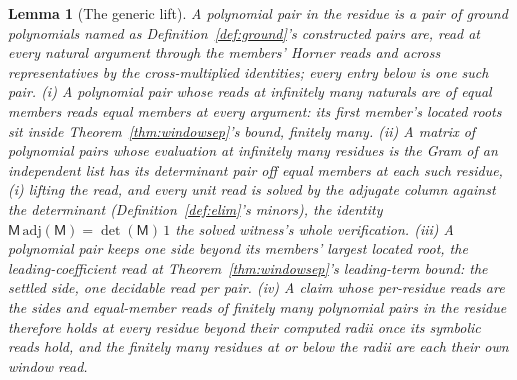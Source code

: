 \documentclass[11pt]{article}
\newtheorem{lemma}{Lemma}
\theoremstyle{definition}
\begin{document}
\begin{lemma}[The generic lift]\label{lem:genericlift}
A \emph{polynomial pair} in the residue is a pair of ground
polynomials named as Definition~\ref{def:ground}'s constructed
pairs are, read at every natural argument through the members' Horner
reads and across representatives by the cross-multiplied identities;
every entry below is one such pair.
\emph{(i)} A polynomial pair whose reads at
infinitely many naturals are of equal members reads equal members at
every argument: its first member's located roots sit inside
Theorem~\ref{thm:windowsep}'s bound, finitely many.
\emph{(ii)} A matrix of polynomial pairs whose evaluation at infinitely many
residues is the Gram of an independent list has its determinant pair
off equal members at each such residue, (i) lifting the read, and
every unit read is solved by the adjugate column against the
determinant (Definition~\ref{def:elim}'s minors), the identity
$\mathsf M\,\mathrm{adj}(\mathsf M)=\det(\mathsf M)\,1$ the
solved witness's whole verification.
\emph{(iii)} A polynomial pair keeps one side beyond its members'
largest located root, the leading-coefficient read at
Theorem~\ref{thm:windowsep}'s leading-term bound: the settled side,
one decidable read per pair.
\emph{(iv)} A claim whose per-residue reads are the sides and
equal-member reads of finitely many polynomial pairs in the residue
therefore holds at
every residue beyond their computed radii once its symbolic reads
hold, and the finitely many residues at or below the radii are each
their own window read.
\end{lemma}
\end{document}
